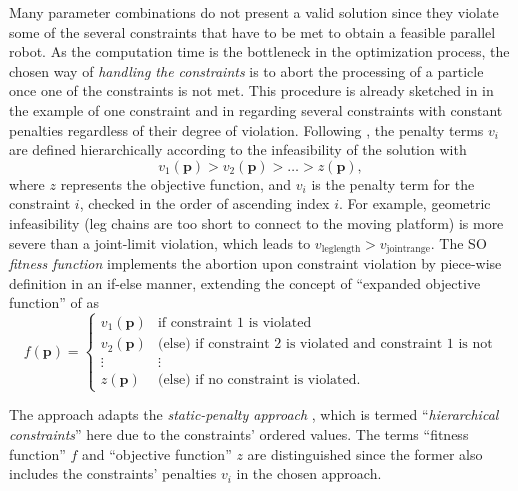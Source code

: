 Many parameter combinations do not present a valid solution since they violate some of the several constraints that have to be met to obtain a feasible parallel robot.
As the computation time is the bottleneck in the optimization process, the chosen way of \emph{handling the constraints} is to abort the processing of a particle once one of the constraints is not met.
This procedure is already sketched in \cite{TarkianPerOelFen2011} in the example of one constraint and in \cite{Ramirez2018} regarding several constraints with constant penalties regardless of their degree of violation.
Following \cite{Ramirez2018}, the penalty terms $v_i$ are defined hierarchically according to the infeasibility of the solution with
%
\begin{equation}
v_1(\bm{p})>v_2(\bm{p})>\dots>z(\bm{p}),
\end{equation}
%
where $z$ represents the objective function, and $v_i$ is the penalty term for the constraint $i$, checked in the order of ascending index $i$.
For example, geometric infeasibility (leg chains are too short to connect to the moving platform) is more severe than a joint-limit violation, which leads to $v_\mathrm{leglength} > v_\mathrm{jointrange}$.
%
The {SO} \emph{fitness function} {implements the abortion upon constraint violation by piece-wise definition in an if-else manner,} extending the concept of ``expanded objective function'' of \cite{Jordehi2015} as
%
\begin{equation}
f(\bm{p})
=
\begin{cases} 
  v_1(\bm{p}) & \text{if constraint 1 is violated} \\
  v_2(\bm{p}) & \text{(else) if constraint 2 is violated and constraint 1 is not} \\
  \vdots & \vdots \\
  z(\bm{p}) & \text{(else) if no constraint is violated}.
\end{cases}
\end{equation}

The %
%
approach adapts the \emph{static-penalty approach} \cite{Jordehi2015}, which is termed ``\emph{hierarchical constraints}'' here due to the constraints' ordered values.
The terms ``fitness function'' $f$ and ``objective function'' $z$ are distinguished since the former also includes the constraints' penalties $v_i$ in the chosen approach.




